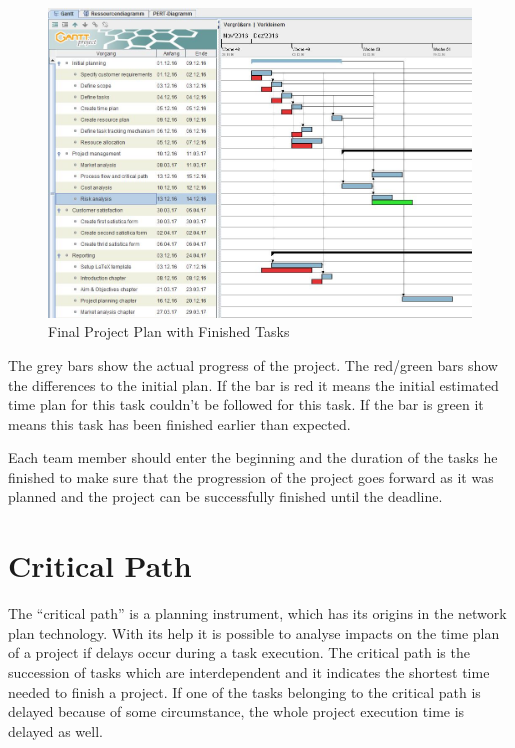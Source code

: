 \begin{figure}[h!]
  \centering
     \includegraphics[width=1\textwidth]
     {res/projectPlan/Tracking.JPG}
     \captionsetup{justification=centering}
  \caption{Final Project Plan with Finished Tasks}
  \label{fig:project plan with finished tasks}
\end{figure}

The grey bars show the actual progress of the project. The red/green bars show
the differences to the initial plan. If the bar is red it means the initial
estimated time plan for this task couldn't be followed for this task. If the bar
is green it means this task has been finished earlier than expected.

Each team member should enter the beginning and the duration of the tasks he
finished to make sure that the progression of the project goes forward as it was
planned and the project can be successfully finished until the deadline.

\FloatBarrier

\section{Critical Path}

The ``critical path'' is a planning instrument, which has its origins in the
network plan technology. With its help it is possible to analyse impacts on the
time plan of a project if delays occur during a task execution. The critical
path is the succession of tasks which are interdependent and it indicates the
shortest time needed to finish a project. If one of the tasks belonging to the
critical path is delayed because of some circumstance, the whole project
execution time is delayed as well.

